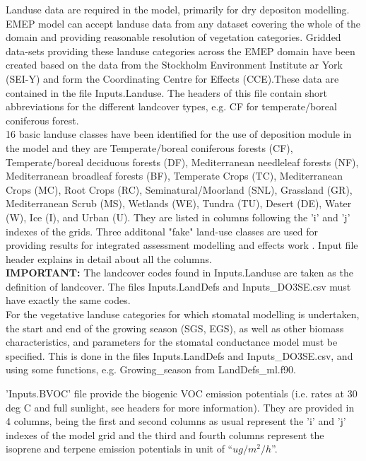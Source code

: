 Landuse data are required in the model, primarily for dry
depositon modelling.  EMEP
model can accept landuse data from any dataset covering the whole of
the domain and providing reasonable resolution of vegetation
categories.  Gridded data-sets providing these landuse categories
across the EMEP domain have been created based on the data from the
Stockholm Environment Institute ar York (SEI-Y) and form the
Coordinating Centre for Effects (CCE).These data are contained in the file Inputs.Landuse. The headers of this file contain short abbreviations for the different landcover types, e.g. CF for temperate/boreal coniferous forest.  \\

 16 basic landuse classes have
been identified for the use of deposition module in the model and they
are Temperate/boreal coniferous forests (CF), Temperate/boreal
deciduous forests (DF), Mediterranean needleleaf forests (NF),
Mediterranean broadleaf forests (BF), Temperate Crops (TC),
Mediterranean Crops (MC), Root Crops (RC), Seminatural/Moorland (SNL),
Grassland (GR), Mediterranean Scrub (MS), Wetlands (WE), Tundra (TU),
Desert (DE), Water (W), Ice (I), and Urban (U).  They are listed in
columns following the 'i' and 'j' indexes of the
grids. Three additonal "fake" land-use classes are used for providing results for integrated assessment modelling and effects work . Input file header explains in detail about all the
columns. \\

{\bf IMPORTANT:} The landcover codes found in Inputs.Landuse are taken as 
the definition of landcover. The files Inputs.LandDefs and Inputs\_DO3SE.csv
must have exactly the same codes.\\

For the vegetative landuse categories for which stomatal modelling is
undertaken, the start and end of the growing season (SGS, EGS), as well as
other biomass characteristics, and parameters for the stomatal conductance
model must be specified. This is done in the files Inputs.LandDefs and
Inputs\_DO3SE.csv, and using some functions, e.g. Growing\_season from
LandDefs\_ml.f90.

'Inputs.BVOC' file provide the biogenic VOC emission potentials (i.e.
rates at 30 deg C and full sunlight, see headers for more information).  They
are provided in 4 columns, being the first and second columns as usual
represent the 'i' and 'j' indexes of the model grid and the third and
fourth columns represent the isoprene and terpene emission potentials in unit of
``$ug/m^{2}/h$''.\\

